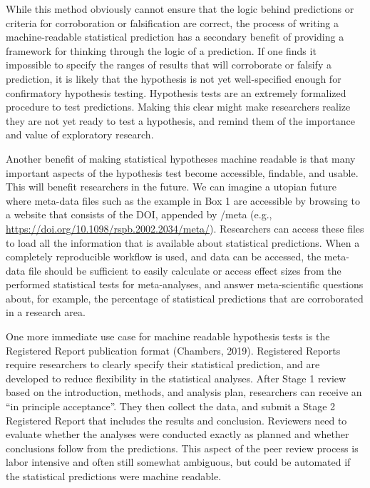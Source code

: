 \documentclass[english,doc,floatsintext]{apa6}
\begin{document}
While this method obviously cannot ensure that the logic behind predictions or criteria for corroboration or falsification are correct, the process of writing a machine-readable statistical prediction has a secondary benefit of providing a framework for thinking through the logic of a prediction. If one finds it impossible to specify the ranges of results that will corroborate or falsify a prediction, it is likely that the hypothesis is not yet well-specified enough for confirmatory hypothesis testing. Hypothesis tests are an extremely formalized procedure to test predictions. Making this clear might make researchers realize they are not yet ready to test a hypothesis, and remind them of the importance and value of exploratory research.

Another benefit of making statistical hypotheses machine readable is that many important aspects of the hypothesis test become accessible, findable, and usable. This will benefit researchers in the future. We can imagine a utopian future where meta-data files such as the example in Box 1 are accessible by browsing to a website that consists of the DOI, appended by /meta (e.g., \url{https://doi.org/10.1098/rspb.2002.2034/meta/}). Researchers can access these files to load all the information that is available about statistical predictions. When a completely reproducible workflow is used, and data can be accessed, the meta-data file should be sufficient to easily calculate or access effect sizes from the performed statistical tests for meta-analyses, and answer meta-scientific questions about, for example, the percentage of statistical predictions that are corroborated in a research area.

One more immediate use case for machine readable hypothesis tests is the Registered Report publication format (Chambers, 2019). Registered Reports require researchers to clearly specify their statistical prediction, and are developed to reduce flexibility in the statistical analyses. After Stage 1 review based on the introduction, methods, and analysis plan, researchers can receive an \enquote{in principle acceptance}. They then collect the data, and submit a Stage 2 Registered Report that includes the results and conclusion. Reviewers need to evaluate whether the analyses were conducted exactly as planned and whether conclusions follow from the predictions. This aspect of the peer review process is labor intensive and often still somewhat ambiguous, but could be automated if the statistical predictions were machine readable.
\end{document}
